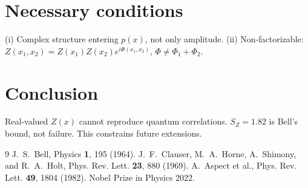 \documentclass[11pt,a4paper]{article}
\begin{document}
\section{Necessary conditions}
(i) Complex structure entering $p(x)$, not only amplitude.
(ii) Non-factorizable: $Z(x_1,x_2)=Z(x_1)Z(x_2)e^{i\Phi(x_1,x_2)}$, $\Phi\neq\Phi_1+\Phi_2$.

\section{Conclusion}
Real-valued $Z(x)$ cannot reproduce quantum correlations. $S_Z=1.82$ is Bell's bound, not failure. This constrains future extensions.

\begin{thebibliography}{9}
 J.~S.~Bell, Physics \textbf{1}, 195 (1964).
 J.~F.~Clauser, M.~A.~Horne, A.~Shimony, and R.~A.~Holt, Phys. Rev. Lett. \textbf{23}, 880 (1969).
 A.~Aspect et al., Phys. Rev. Lett. \textbf{49}, 1804 (1982).
 Nobel Prize in Physics 2022.
\end{thebibliography}
\end{document}
